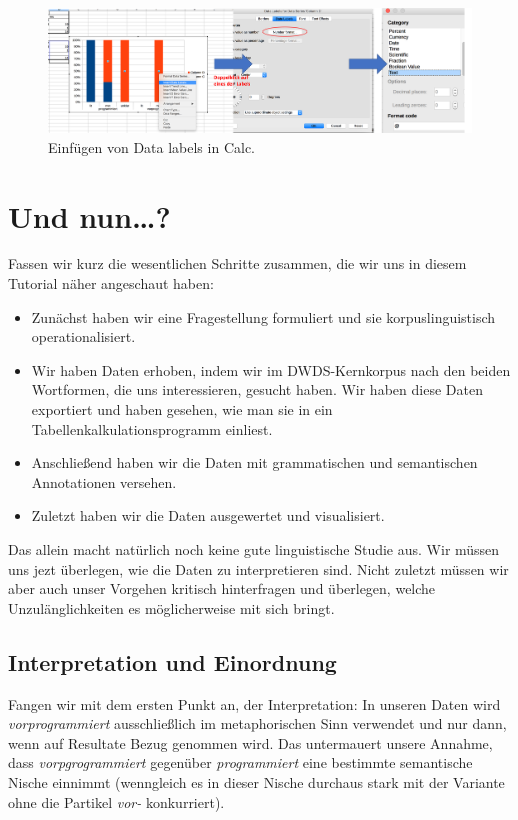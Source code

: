 \documentclass[]{article}
\providecommand{\tightlist}{%
  \setlength{\itemsep}{0pt}\setlength{\parskip}{0pt}}
\begin{document}
\begin{figure}
\includegraphics[width=6.66in]{docs/fig/calc_datalabels} \caption{Einfügen von Data labels in Calc.}\label{fig:calcdatalabels}
\end{figure}

\section{Und nun\ldots{}?}\label{und-nun}

Fassen wir kurz die wesentlichen Schritte zusammen, die wir uns in
diesem Tutorial näher angeschaut haben:

\begin{itemize}
\tightlist
\item
  Zunächst haben wir eine Fragestellung formuliert und sie
  korpuslinguistisch operationalisiert.
\item
  Wir haben Daten erhoben, indem wir im DWDS-Kernkorpus nach den beiden
  Wortformen, die uns interessieren, gesucht haben. Wir haben diese
  Daten exportiert und haben gesehen, wie man sie in ein
  Tabellenkalkulationsprogramm einliest.
\item
  Anschließend haben wir die Daten mit grammatischen und semantischen
  Annotationen versehen.
\item
  Zuletzt haben wir die Daten ausgewertet und visualisiert.
\end{itemize}

Das allein macht natürlich noch keine gute linguistische Studie aus. Wir
müssen uns jezt überlegen, wie die Daten zu interpretieren sind. Nicht
zuletzt müssen wir aber auch unser Vorgehen kritisch hinterfragen und
überlegen, welche Unzulänglichkeiten es möglicherweise mit sich bringt.

\subsection{Interpretation und
Einordnung}\label{interpretation-und-einordnung}

Fangen wir mit dem ersten Punkt an, der Interpretation: In unseren Daten
wird \emph{vorprogrammiert} ausschließlich im metaphorischen Sinn
verwendet und nur dann, wenn auf Resultate Bezug genommen wird. Das
untermauert unsere Annahme, dass \emph{vorpgrogrammiert} gegenüber
\emph{programmiert} eine bestimmte semantische Nische einnimmt
(wenngleich es in dieser Nische durchaus stark mit der Variante ohne die
Partikel \emph{vor-} konkurriert).
\end{document}
